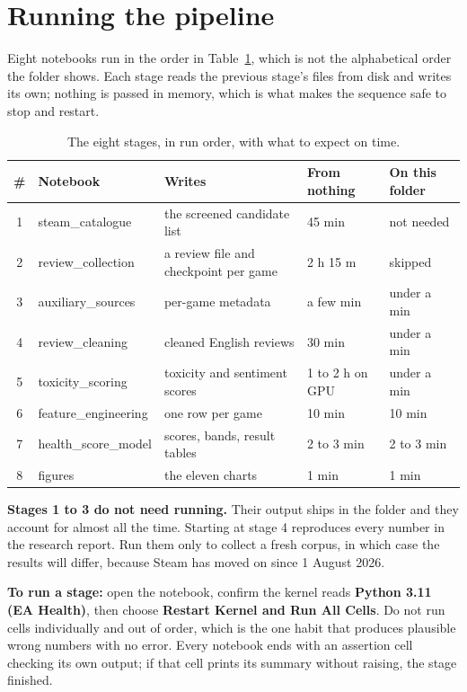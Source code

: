 \section{Running the pipeline}
\label{sec:pipeline}

Eight notebooks run in the order in Table~\ref{tab:stages}, which is not the alphabetical order the
folder shows. Each stage reads the previous stage's files from disk and writes its own; nothing is
passed in memory, which is what makes the sequence safe to stop and restart.

\begin{table}[htbp]
\centering
\caption{The eight stages, in run order, with what to expect on time.}
\label{tab:stages}
\small
\begin{tabular}{|c|p{3.2cm}|p{4.6cm}|p{2.6cm}|p{2.4cm}|}
\hline
\textbf{\#} & \textbf{Notebook} & \textbf{Writes} & \textbf{From nothing} & \textbf{On this
folder} \\
\hline
1 & steam\_catalogue & the screened candidate list & 45 min & not needed \\
\hline
2 & review\_collection & a review file and checkpoint per game & 2 h 15 m & skipped \\
\hline
3 & auxiliary\_sources & per-game metadata & a few min & under a min \\
\hline
4 & review\_cleaning & cleaned English reviews & 30 min & under a min \\
\hline
5 & toxicity\_scoring & toxicity and sentiment scores & 1 to 2 h on GPU & under a min \\
\hline
6 & feature\_engineering & one row per game & 10 min & 10 min \\
\hline
7 & health\_score\_model & scores, bands, result tables & 2 to 3 min & 2 to 3 min \\
\hline
8 & figures & the eleven charts & 1 min & 1 min \\
\hline
\end{tabular}
\end{table}

\textbf{Stages 1 to 3 do not need running.} Their output ships in the folder and they account for
almost all the time. Starting at stage 4 reproduces every number in the research report. Run them
only to collect a fresh corpus, in which case the results will differ, because Steam has moved on
since 1 August 2026.

\textbf{To run a stage:} open the notebook, confirm the kernel reads \textbf{Python 3.11 (EA
Health)}, then choose \textbf{Restart Kernel and Run All Cells}. Do not run cells individually and
out of order, which is the one habit that produces plausible wrong numbers with no error. Every
notebook ends with an assertion cell checking its own output; if that cell prints its summary
without raising, the stage finished.

